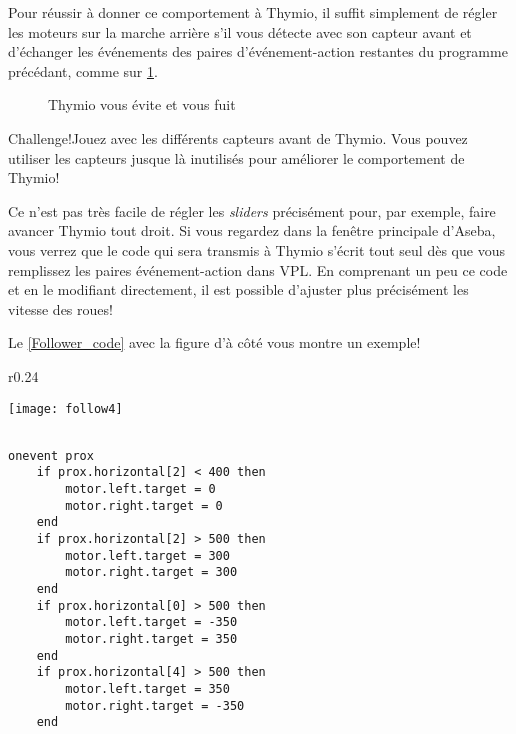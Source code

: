 Pour réussir à donner ce  comportement à Thymio, il suffit simplement de régler les moteurs sur la marche arrière s'il vous détecte avec son capteur avant et d'échanger les événements des paires d'événement-action restantes du programme précédant, comme sur \cref{fig.recule-evite}.

\begin{figure}[h]
    \centering
    \hspace{1cm}
    \caption{Thymio vous évite et vous fuit}
    \label{fig.recule-evite}
\end{figure}

\begin{bclogo}[couleur = pink!30, arrondi = 0.1, logo = \bccrayon, ombre = true]{Challenge!}Jouez avec les différents capteurs avant de Thymio. Vous pouvez utiliser les capteurs jusque là inutilisés pour améliorer le comportement de Thymio!
\end{bclogo}


Ce n'est pas très facile de régler les \textit{sliders} précisément pour, par exemple, faire avancer Thymio tout droit. Si vous regardez dans la fenêtre principale d'Aseba, vous verrez que le code qui sera transmis à Thymio s'écrit tout seul dès que vous remplissez les paires événement-action dans VPL. En comprenant un peu ce code et en le modifiant directement, il est possible d'ajuster plus précisément les vitesse des roues!

Le \cref{Follower_code} avec la figure d'à côté vous montre un exemple!

\begin{wrapfigure}{r}{0.24\textwidth}
  \begin{center}
    \texttt{[image: follow4]}
  \end{center}
\end{wrapfigure}

\begin{small}
\begin{lstlisting}[frame=single, caption={Thymio vous suit}, label=Follower_code, linewidth=9cm] 

onevent prox
	if prox.horizontal[2] < 400 then
		motor.left.target = 0
		motor.right.target = 0
	end
	if prox.horizontal[2] > 500 then
		motor.left.target = 300
		motor.right.target = 300
	end
	if prox.horizontal[0] > 500 then
		motor.left.target = -350
		motor.right.target = 350
	end
	if prox.horizontal[4] > 500 then
		motor.left.target = 350
		motor.right.target = -350
	end

\end{lstlisting}
	\end{small}

